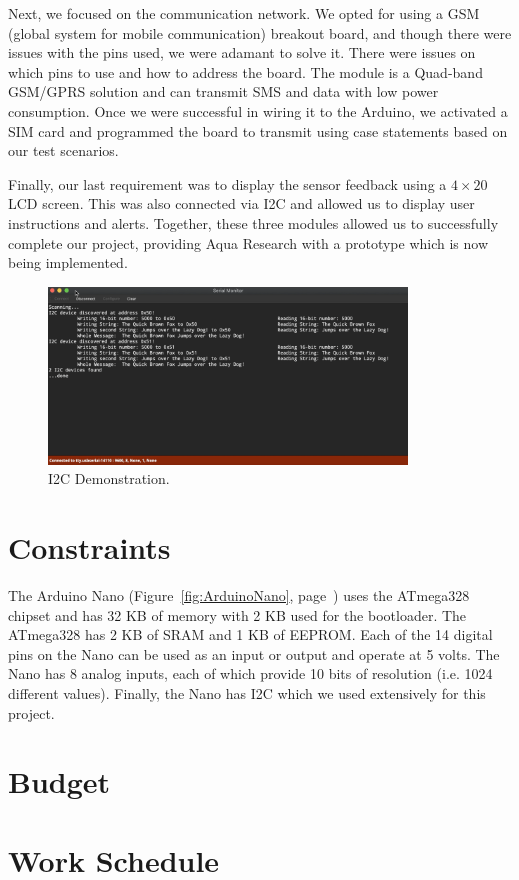 \documentclass[12pt]{article}
\begin{document}
\noindent Next, we focused on the communication network. We opted for using a GSM (global system for mobile communication) breakout board, and though there were issues with the pins used, we were adamant to solve it. There were issues on which pins to use and how to address the board. The module is a Quad-band GSM/GPRS solution and can transmit SMS and data with low power consumption. Once we were successful in wiring it to the Arduino, we activated a SIM card and programmed the board to transmit using case statements based on our test scenarios.

\noindent Finally, our last requirement was to display the sensor feedback using a $4\times20$ LCD screen. This was also connected via I2C and allowed us to display user instructions and alerts. Together, these three modules allowed us to successfully complete our project, providing Aqua Research with a prototype which is now being implemented.
\begin{figure}[h!]
    \centering
    \includegraphics[width=0.85\textwidth]{Screenshot.png}
    \caption{I2C Demonstration.}
    \label{fig:I2Cdemo}
\end{figure}
\section{Constraints}
The Arduino Nano (Figure~\ref{fig:ArduinoNano}, page~\pageref{fig:ArduinoNano}) uses the ATmega328 chipset and has 32 KB of memory with 2 KB used for the bootloader. The ATmega328 has 2 KB of SRAM and 1 KB of EEPROM. Each of the 14 digital pins on the Nano can be used as an input or output and operate at 5 volts. The Nano has 8 analog inputs, each of which provide 10 bits of resolution (i.e. 1024 different values). Finally, the Nano has I2C which we used extensively for this project.
\section{Budget}
\section{Work Schedule}
\end{document}
